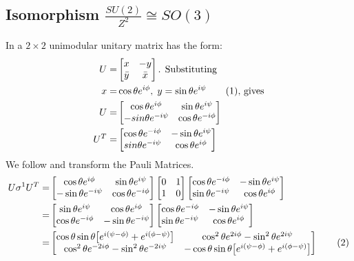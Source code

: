 \documentclass[]{article}
\newcommand\numberthis{\addtocounter{equation}{1}\tag{\theequation}}
\begin{document}
\subsection{Isomorphism $\frac{SU(2)}{Z^2} \cong SO(3)$}
In \cite[Section 3]{westra2008SU2} a $2\times 2$ unimodular unitary matrix has the form:
\begin{align*}
	U =& \begin{bmatrix}
		x&-y\\
		\bar{y}&\bar{x}
	\end{bmatrix} \text{. Substituting}\\
	x =& \cos{\theta} e^{i\phi}, \; y = \sin{\theta} e^{i\psi} \numberthis \label{eq:xy} \text{, gives} \\
	U=& \begin{bmatrix}
		\cos{\theta} e^{i\phi}&\sin{\theta}e^{i\psi}\\
		-sin{\theta}e^{-i\psi}&\cos{\theta} e^{-i\phi}
	\end{bmatrix}\\
	U^T =& \begin{bmatrix}
		\cos{\theta} e^{-i\phi}&-\sin{\theta}e^{i\psi}\\
		sin{\theta}e^{-i\psi}&\cos{\theta} e^{i\phi}
	\end{bmatrix}
\end{align*}
We follow \cite[Section 4]{westra2008SU2} and transform the Pauli Matrices.
\begin{align*}
	U \sigma^1 U^T  =&  \begin{bmatrix}
		\cos{\theta} e^{i\phi}&\sin{\theta}e^{i\psi}\\
		-\sin{\theta}e^{-i\psi}&\cos{\theta} e^{-i\phi}
	\end{bmatrix} \begin{bmatrix}
		0&1\\
		1&0
	\end{bmatrix} \begin{bmatrix}
		\cos{\theta} e^{-i\phi}&-\sin{\theta}e^{i\psi}\\
		\sin{\theta}e^{-i\psi}&\cos{\theta} e^{i\phi}
	\end{bmatrix}\\
	=&  \begin{bmatrix}
		\sin{\theta}e^{i\psi} & \cos{\theta} e^{i\phi}\\
		\cos{\theta} e^{-i\phi}&-\sin{\theta}e^{-i\psi}
	\end{bmatrix} \begin{bmatrix}
		\cos{\theta} e^{-i\phi}&-\sin{\theta}e^{i\psi}\\
		\sin{\theta}e^{-i\psi}&\cos{\theta} e^{i\phi}
	\end{bmatrix}\\
	=& \begin{bmatrix}
		\cos\theta \sin\theta\big[e^{i(\psi-\phi)}+e^{i(\phi-\psi)}\big]&\cos^2\theta e^{2i\phi}-\sin^2\theta e^{2i\psi} \\
		\cos^2\theta e^{-2i\phi}-\sin^2\theta e^{-2i\psi}&-\cos\theta \sin\theta\big[e^{i(\psi-\phi)}+e^{i(\phi-\psi)}\big]
	\end{bmatrix} \numberthis \label{eq:U:sigma1:UT}
\end{align*}
\end{document}
